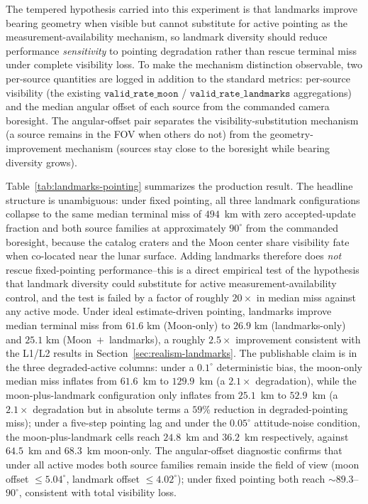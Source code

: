 \documentclass[10pt,twocolumn]{article}
\begin{document}
The tempered hypothesis carried into this experiment is that landmarks improve bearing geometry when visible but cannot substitute for active pointing as the measurement-availability mechanism, so landmark diversity should reduce performance \emph{sensitivity} to pointing degradation rather than rescue terminal miss under complete visibility loss.  To make the mechanism distinction observable, two per-source quantities are logged in addition to the standard metrics: per-source visibility (the existing $\texttt{valid\_rate\_moon}$ / $\texttt{valid\_rate\_landmarks}$ aggregations) and the median angular offset of each source from the commanded camera boresight.  The angular-offset pair separates the visibility-substitution mechanism (a source remains in the FOV when others do not) from the geometry-improvement mechanism (sources stay close to the boresight while bearing diversity grows).

Table~\ref{tab:landmarks-pointing} summarizes the production result.  The headline structure is unambiguous: under fixed pointing, all three landmark configurations collapse to the same median terminal miss of $494$~km with zero accepted-update fraction and both source families at approximately $90^{\circ}$ from the commanded boresight, because the catalog craters and the Moon center share visibility fate when co-located near the lunar surface.  Adding landmarks therefore does \emph{not} rescue fixed-pointing performance--this is a direct empirical test of the hypothesis that landmark diversity could substitute for active measurement-availability control, and the test is failed by a factor of roughly $20\times$ in median miss against any active mode.  Under ideal estimate-driven pointing, landmarks improve median terminal miss from $61.6$ km (Moon-only) to $26.9$ km (landmarks-only) and $25.1$ km (Moon~$+$~landmarks), a roughly $2.5\times$ improvement consistent with the L1/L2 results in Section~\ref{sec:realism-landmarks}.  The publishable claim is in the three degraded-active columns: under a $0.1^{\circ}$ deterministic bias, the moon-only median miss inflates from $61.6$~km to $129.9$~km (a $2.1\times$ degradation), while the moon-plus-landmark configuration only inflates from $25.1$~km to $52.9$~km (a $2.1\times$ degradation but in absolute terms a $59\%$ reduction in degraded-pointing miss); under a five-step pointing lag and under the $0.05^{\circ}$ attitude-noise condition, the moon-plus-landmark cells reach $24.8$~km and $36.2$~km respectively, against $64.5$~km and $68.3$~km moon-only.  The angular-offset diagnostic confirms that under all active modes both source families remain inside the field of view (moon offset $\le 5.04^{\circ}$, landmark offset $\le 4.02^{\circ}$); under fixed pointing both reach $\sim 89.3$--$90^{\circ}$, consistent with total visibility loss.
\end{document}
